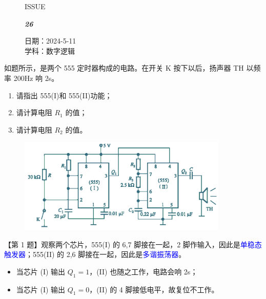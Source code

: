 \documentclass[UTF8]{ctexart}
\newcommand\Black[1]{\textcolor[gray]{0.3}{#1}}
\newcommand\Brown[1]{\textcolor[HTML]{998A4E}{#1}}
\newcommand\IssueNumber{26}
\newcommand\Date{2024-5-11}
\newcommand\Subject{数字逻辑}
\begin{document}
\begin{figure}[H]
\hspace{1cm}
\begin{minipage}[t]{0.3\textwidth}
\centering
    \Brown{\Genshin ISSUE}

    \vspace{-0.6cm}
    \Huge \Issue\slshape\bfseries\Black{\IssueNumber}
\end{minipage}
\hfill
\begin{minipage}[t]{0.35\textwidth}
\small
\centering
    \Brown{日期：\Date} \\
\vspace{-0.1cm}
    \Brown{学科：\Subject} \\
\end{minipage}
\hspace{0.8cm}
\end{figure}

{\color{cyan!50!black}
如题所示，是两个 555 定时器构成的电路。在开关 K 按下以后，扬声器 TH 以频率 200Hz 响 2s。
\begin{enumerate}[itemsep=0pt,parsep=0pt]
  \item 请指出 555(I)和 555(II)功能；
  \item 请计算电阻 $R_1$ 的值；
  \item 请计算电阻 $R_2$ 的值。
\end{enumerate}
\begin{figure}[htb]
  \centering
  \includegraphics[width=10cm]{题目-1.png}
\end{figure}
}

【第 1 题】观察两个芯片，555(I) 的 6,7 脚接在一起，2 脚作输入，因此是\textcolor{blue}{单稳态触发器}；555(II) 的 2,6 脚接在一起，因此是\textcolor{blue}{多谐振荡器}。

\begin{itemize}[itemsep=0pt,parsep=0pt]
  \item 当芯片 (I) 输出 $Q_1=1$，(II) 也随之工作，电路会响 2s；
  \item 当芯片 (I) 输出 $Q_1=0$，(II) 的 4 脚接低电平，故复位不工作。
\end{itemize}
\end{document}
